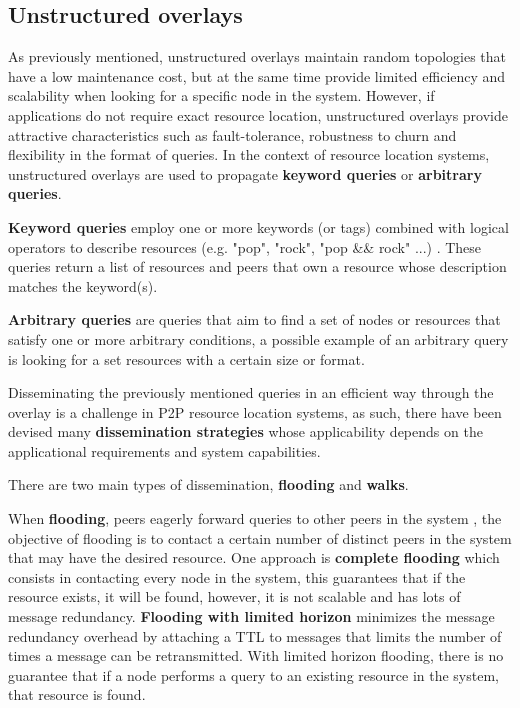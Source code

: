 \subsection{Unstructured overlays}

As previously mentioned, unstructured overlays maintain random topologies that have a low maintenance cost, but at the same time provide limited efficiency and scalability when looking for a specific node in the system. However, if applications do not require exact resource location, unstructured overlays provide attractive characteristics such as fault-tolerance, robustness to churn and flexibility in the format of queries.  In the context of resource location systems, unstructured overlays are used to propagate \textbf{keyword queries} or \textbf{arbitrary queries}.

\textbf{Keyword queries} employ one or more keywords (or tags) combined with logical operators to describe resources (e.g. "pop", "rock", "pop && rock" ...) . These queries return a list of resources and peers that own a resource whose description matches the keyword(s).

\textbf{Arbitrary queries} are queries that aim to find a set of nodes or resources that satisfy one or more arbitrary conditions, a possible example of an arbitrary query is looking for a set resources with a certain size or format.

Disseminating the previously mentioned queries in an efficient way through the overlay is a challenge in P2P resource location systems, as such, there have been devised many \textbf{dissemination strategies} whose applicability depends on the applicational requirements and system capabilities.

There are two main types of dissemination, \textbf{flooding} and \textbf{walks}.

When \textbf{flooding}, peers eagerly forward queries to other peers in the system , the objective of flooding is to contact a certain number of distinct peers in the system that may have the desired resource. One approach is \textbf{complete flooding} which consists in contacting every node in the system, this guarantees that if the resource exists, it will be found, however, it is not scalable and has lots of message redundancy. \textbf{Flooding with limited horizon} minimizes the message redundancy overhead by attaching a TTL to messages that limits the number of times a message can be retransmitted. With limited horizon flooding, there is no guarantee that if a node performs a query to an existing resource in the system, that resource is found.

